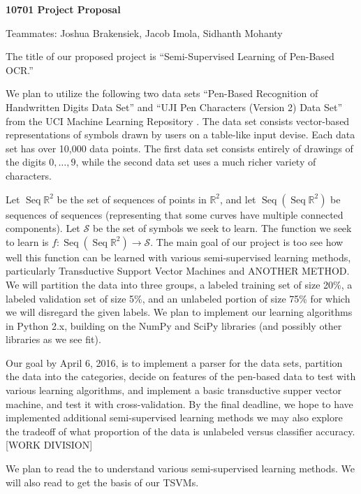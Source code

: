 \documentclass[11pt]{article}
\begin{document}
\newcommand{\Seq}{\operatorname{Seq}}
\begin{center}
  \textbf{10701 Project Proposal}
  
Teammates: Joshua Brakensiek, Jacob Imola, Sidhanth Mohanty
\end{center}

The title of our proposed project is ``Semi-Supervised Learning of Pen-Based OCR.''

We plan to utilize the following two data sets ``Pen-Based Recognition of Handwritten Digits Data Set'' \cite{Alpaydin:1998} and  ``UJI Pen Characters (Version 2) Data Set'' \cite{Llorens:2008} from the UCI Machine Learning Repository \cite{Lichman:2013}. The data set consists vector-based representations of symbols drawn by users on a table-like input devise. Each data set has over 10,000 data points. The first data set consists entirely of drawings of the digits $0, \hdots, 9$, while the second data set uses a much richer variety of characters.

Let $\Seq \mathbb R^2$ be the set of sequences of points in $\mathbb R^2$, and let $\Seq (\Seq \mathbb R^2)$ be sequences of sequences (representing that some curves have multiple connected components). Let $\mathcal S$ be the set of symbols we seek to learn. The function we seek to learn is $f : \Seq (\Seq \mathbb R^2) \to \mathcal S$. The main goal of our project is too see how well this function can be learned with various semi-supervised learning methods, particularly Transductive Support Vector Machines and ANOTHER METHOD. We will partition the data into three groups, a labeled training set of size 20\%, a labeled validation set of size 5\%, and an unlabeled portion of size 75\% for which we will disregard the given labels. We plan to implement our learning algorithms in Python 2.x, building on the NumPy and SciPy libraries (and possibly other libraries as we see fit).

Our goal by April 6, 2016, is to implement a parser for the data sets, partition the data into the categories, decide on features of the pen-based data to test with various learning algorithms, and implement a basic transductive supper vector machine, and test it with cross-validation. By the final deadline, we hope to have implemented additional semi-supervised learning methods we may also explore the tradeoff of what proportion of the data is unlabeled versus classifier accuracy. [WORK DIVISION]

We plan to read the \cite{Zhu:2005} to understand various semi-supervised learning methods. We will also read \cite{??} to get the basis of our TSVMs.



\end{document}
